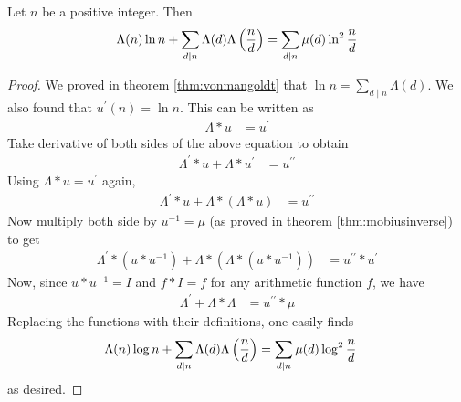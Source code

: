 \begin{theorem}
	Let $n$ be a positive integer. Then
		\begin{align*}
			\Lambda(n)\ln n+\sum_{d\mid n}\Lambda(d)\Lambda\left(\frac nd\right)=\sum_{d\mid n}\mu(d)\ln^2\frac nd
		\end{align*}
\end{theorem}
\begin{proof}
	We proved in theorem \eqref{thm:vonmangoldt} that $\ln n=\sum_{d\mid n}\Lambda(d)$. We also found that $u^\prime(n) = \ln n$. This can be written as
		\begin{align*}
			\Lambda\ast u & =u^\prime
		\end{align*}
	Take derivative of both sides of the above equation to obtain
		\begin{align*}
			\Lambda^\prime\ast u+\Lambda\ast u^\prime & =u^{\prime\prime}
		\end{align*}
	Using $\Lambda\ast u  =u^\prime$ again,
		\begin{align*}
			\Lambda^\prime\ast u+\Lambda\ast(\Lambda\ast u) & =u^{\prime\prime}
		\end{align*}
	Now multiply both side by $u^{-1}=\mu$ (as proved in theorem \eqref{thm:mobiusinverse}) to get
		\begin{align*}
			\Lambda^\prime\ast(u\ast u^{-1})+\Lambda\ast(\Lambda\ast(u\ast u^{-1}))
				& =u^{\prime\prime}\ast u^\prime
		\end{align*}
	Now, since $u \ast u^{-1} = I$ and $f \ast I = f$ for any arithmetic function $f$, we have
		\begin{align*}
			\Lambda^\prime+\Lambda\ast\Lambda & =u^{\prime\prime}\ast\mu
		\end{align*}
	Replacing the functions with their definitions, one easily finds
		\begin{align*}
			\Lambda(n)\log n+\sum_{d\mid n}\Lambda(d)\Lambda\left(\dfrac nd\right) & =\sum_{d\mid n}\mu(d)\log^2\dfrac nd
		\end{align*}
	as desired.
\end{proof}
